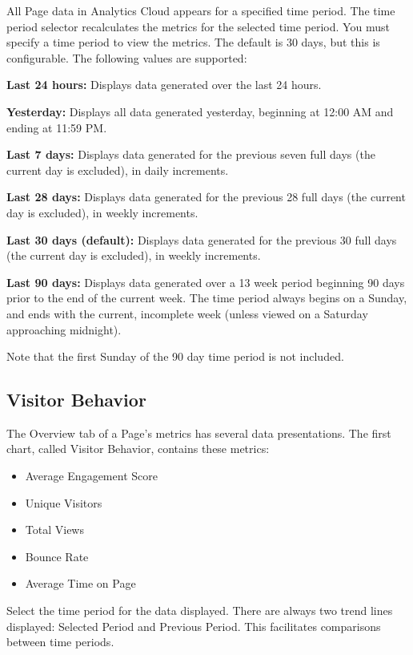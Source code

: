 All Page data in Analytics Cloud appears for a specified time period.
The time period selector recalculates the metrics for the selected time
period. You must specify a time period to view the metrics. The default
is 30 days, but this is configurable. The following values are
supported:

\textbf{Last 24 hours:} Displays data generated over the last 24 hours.

\textbf{Yesterday:} Displays all data generated yesterday, beginning at
12:00 AM and ending at 11:59 PM.

\textbf{Last 7 days:} Displays data generated for the previous seven
full days (the current day is excluded), in daily increments.

\textbf{Last 28 days:} Displays data generated for the previous 28 full
days (the current day is excluded), in weekly increments.

\textbf{Last 30 days (default):} Displays data generated for the
previous 30 full days (the current day is excluded), in weekly
increments.

\textbf{Last 90 days:} Displays data generated over a 13 week period
beginning 90 days prior to the end of the current week. The time period
always begins on a Sunday, and ends with the current, incomplete week
(unless viewed on a Saturday approaching midnight).

Note that the first Sunday of the 90 day time period is not included.

\subsection{Visitor Behavior}\label{visitor-behavior}

The Overview tab of a Page's metrics has several data presentations. The
first chart, called Visitor Behavior, contains these metrics:

\begin{itemize}
\tightlist
\item
  Average Engagement Score
\item
  Unique Visitors
\item
  Total Views
\item
  Bounce Rate
\item
  Average Time on Page
\end{itemize}

Select the time period for the data displayed. There are always two
trend lines displayed: Selected Period and Previous Period. This
facilitates comparisons between time periods.

